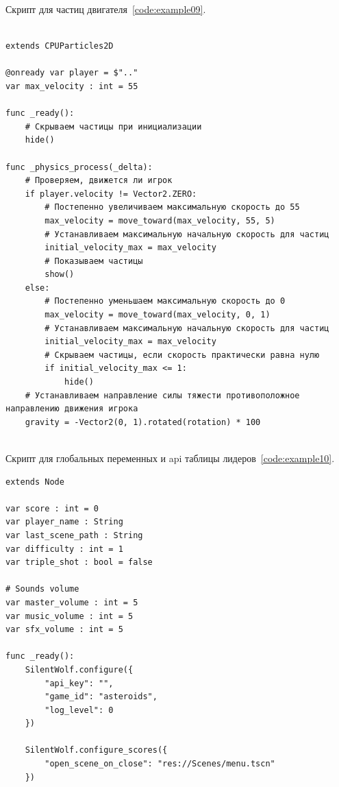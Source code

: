 \label{{subsec:ch02/sec01/sub10}Подраздел 10. Скрипт для частиц двигателя}
Скрипт для частиц двигателя~\ref{code:example09}.
\begin{code}
\vspace{-\baselineskip}\begin{verbatim}

extends CPUParticles2D

@onready var player = $".."
var max_velocity : int = 55

func _ready():
    # Скрываем частицы при инициализации
    hide()

func _physics_process(_delta):
    # Проверяем, движется ли игрок
    if player.velocity != Vector2.ZERO:
        # Постепенно увеличиваем максимальную скорость до 55
        max_velocity = move_toward(max_velocity, 55, 5)
        # Устанавливаем максимальную начальную скорость для частиц
        initial_velocity_max = max_velocity
        # Показываем частицы
        show()
    else:
        # Постепенно уменьшаем максимальную скорость до 0
        max_velocity = move_toward(max_velocity, 0, 1)
        # Устанавливаем максимальную начальную скорость для частиц
        initial_velocity_max = max_velocity
        # Скрываем частицы, если скорость практически равна нулю
        if initial_velocity_max <= 1:
            hide()
    # Устанавливаем направление силы тяжести противоположное направлению движения игрока
    gravity = -Vector2(0, 1).rotated(rotation) * 100


\end{verbatim}
\end{code}

\label{{subsec:ch02/sec01/sub11}Подраздел 11. Скрипт для глобальных переменных и api таблицы лидеров}
Скрипт для глобальных переменных и api таблицы лидеров~\ref{code:example10}.
\begin{code}
\vspace{-\baselineskip}\begin{verbatim}
extends Node

var score : int = 0
var player_name : String
var last_scene_path : String
var difficulty : int = 1
var triple_shot : bool = false

# Sounds volume
var master_volume : int = 5
var music_volume : int = 5
var sfx_volume : int = 5

func _ready():
    SilentWolf.configure({
        "api_key": "",
        "game_id": "asteroids",
        "log_level": 0
    })

    SilentWolf.configure_scores({
        "open_scene_on_close": "res://Scenes/menu.tscn"
    })

\end{verbatim}
\end{code}

